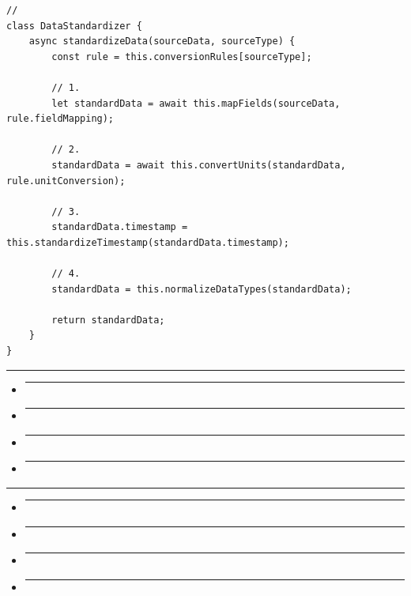 \begin{verbatim}
// 
class DataStandardizer {
    async standardizeData(sourceData, sourceType) {
        const rule = this.conversionRules[sourceType];
        
        // 1. 
        let standardData = await this.mapFields(sourceData, rule.fieldMapping);
        
        // 2. 
        standardData = await this.convertUnits(standardData, rule.unitConversion);
        
        // 3. 
        standardData.timestamp = this.standardizeTimestamp(standardData.timestamp);
        
        // 4. 
        standardData = this.normalizeDataTypes(standardData);
        
        return standardData;
    }
}
\end{verbatim}

\begin{center}\rule{0.5\linewidth}{0.5pt}\end{center}

\begin{itemize}
\item
  \begin{center}\rule{0.5\linewidth}{0.5pt}\end{center}
\item
  \begin{center}\rule{0.5\linewidth}{0.5pt}\end{center}
\item
  \begin{center}\rule{0.5\linewidth}{0.5pt}\end{center}
\item
  \begin{center}\rule{0.5\linewidth}{0.5pt}\end{center}
\end{itemize}

\begin{center}\rule{0.5\linewidth}{0.5pt}\end{center}

\begin{itemize}
\item
  \begin{center}\rule{0.5\linewidth}{0.5pt}\end{center}
\item
  \begin{center}\rule{0.5\linewidth}{0.5pt}\end{center}
\item
  \begin{center}\rule{0.5\linewidth}{0.5pt}\end{center}
\item
  \begin{center}\rule{0.5\linewidth}{0.5pt}\end{center}
\end{itemize}

